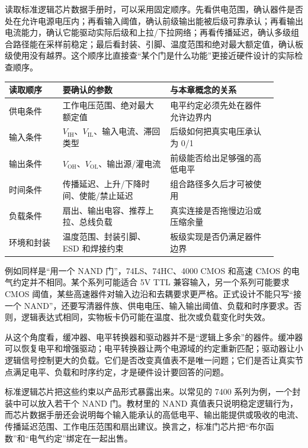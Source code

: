 读取标准逻辑芯片数据手册时，可以采用固定顺序。先看供电范围，确认器件是否处在允许电源电压内；再看输入阈值，确认前级输出能被后级可靠承认；再看输出电流能力，确认它能驱动实际后级和上拉/下拉网络；再看传播延迟，确认多级组合路径能在采样前稳定；最后看封装、引脚、温度范围和绝对最大额定值，确认板级使用没有越界。这个顺序比直接查“某个门是什么功能”更接近硬件设计的实际检查顺序。

\begin{longtable}{L{0.18\linewidth}L{0.36\linewidth}L{0.36\linewidth}}
\toprule
读取顺序 & 要确认的参数 & 与本章概念的关系 \\
\midrule
供电条件 & 工作电压范围、绝对最大额定值 & 电平约定必须先处在器件允许边界内 \\\tablerowrule
输入条件 & $V_\mathrm{IH}$、$V_\mathrm{IL}$、输入电流、滞回类型 & 后级如何把真实电压承认为 0/1 \\\tablerowrule
输出条件 & $V_\mathrm{OH}$、$V_\mathrm{OL}$、输出源/灌电流 & 前级能否给出足够强的高低电平 \\\tablerowrule
时间条件 & 传播延迟、上升/下降时间、使能/禁止延迟 & 组合路径多久后才可被使用 \\\tablerowrule
负载条件 & 扇出、输出电容、推荐上拉、总线负载 & 真实连接是否拖慢边沿或压缩余量 \\\tablerowrule
环境和封装 & 温度范围、封装引脚、ESD 和焊接约束 & 板级实现是否仍满足器件边界 \\
\bottomrule
\end{longtable}

例如同样是“用一个 NAND 门”，74LS、74HC、4000 CMOS 和高速 CMOS 的电气约定并不相同。某个系列可能适合 5V TTL 兼容输入，另一个系列可能要求 CMOS 阈值，某些高速器件对输入边沿和去耦要求更严格。正式设计不能只写“接一个 NAND”，还要写清器件族、供电电压、输入输出阈值、负载和时序要求。否则，逻辑表达式相同，实物板卡仍可能在温度、批次或负载变化时失效。

从这个角度看，缓冲器、电平转换器和驱动器并不是“逻辑上多余”的器件。缓冲器可以恢复电平和增强驱动；电平转换器让两个电源域的约定重新匹配；驱动器让小逻辑信号控制更大的负载。它们是否改变真值表不是唯一问题；它们是否让真实节点满足电平、负载和时序约定，才是硬件设计要回答的问题。

标准逻辑芯片把这些约束以产品形式暴露出来。以常见的 7400 系列为例，一个封装中可以放入若干个 NAND 门。教材里的 NAND 真值表只说明稳定逻辑行为，而芯片数据手册还会说明每个输入能承认的高低电平、输出能提供或吸收的电流、传播延迟范围、工作电压范围和扇出建议。换言之，标准门芯片把“布尔函数”和“电气约定”绑定在一起出售。

